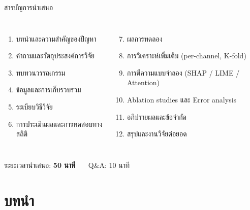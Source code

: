 \documentclass[aspectratio=169,11pt,xcolor=dvipsnames]{beamer}
\newcommand{\hl}[1]{\textcolor{kmitlOrange}{\textbf{#1}}}
\begin{document}
\begin{frame}{สารบัญการนำเสนอ}
  \begin{columns}[T,onlytextwidth]
    \begin{enumerate}\setlength\itemsep{0.3em}
      \item บทนำและความสำคัญของปัญหา
      \item คำถามและวัตถุประสงค์การวิจัย
      \item ทบทวนวรรณกรรม
      \item ข้อมูลและการเก็บรวบรวม
      \item ระเบียบวิธีวิจัย
      \item การประเมินผลและการทดสอบทางสถิติ
    \end{enumerate}
    \begin{enumerate}\setcounter{enumi}{6}\setlength\itemsep{0.3em}
      \item ผลการทดลอง
      \item การวิเคราะห์เพิ่มเติม (per-channel, K-fold)
      \item การตีความแบบจำลอง (SHAP / LIME / Attention)
      \item Ablation studies และ Error analysis
      \item อภิปรายผลและข้อจำกัด
      \item สรุปและงานวิจัยต่อยอด
    \end{enumerate}
  \end{columns}
  \vfill
  \begin{center}
    \footnotesize ระยะเวลานำเสนอ: \hl{50 นาที} \ \textbullet\ \ Q\&A: 10 นาที
  \end{center}
\end{frame}

\section{บทนำ}
\end{document}
